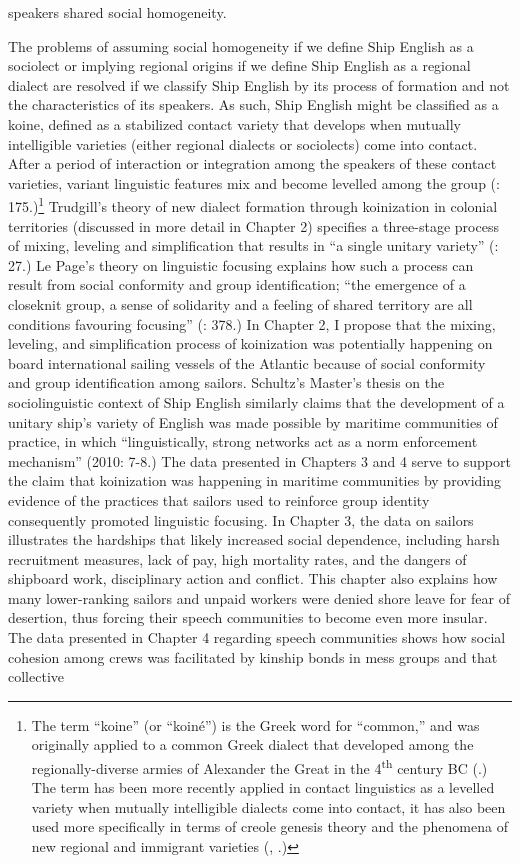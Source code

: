speakers shared social homogeneity. 

  The problems of assuming social homogeneity if we define Ship English as a sociolect or implying regional origins if we define Ship English as a regional dialect are resolved if we classify Ship English by its process of formation and not the characteristics of its speakers. As such, Ship English might be classified as a koine, defined as a stabilized contact variety that develops when mutually intelligible varieties (either regional dialects or sociolects) come into contact. After a period of interaction or integration among the speakers of these contact varieties, variant linguistic features mix and become levelled among the group (\citealt{Siegel2001}: 175.)\footnote{The term “koine” (or “koiné”) is the Greek word for “common,” and was originally applied to a common Greek dialect that developed among the regionally-diverse armies of Alexander the Great in the 4\textsuperscript{th} century BC (\citealt{Andriotis1995}.) The term has been more recently applied in contact linguistics as a levelled variety when mutually intelligible dialects come into contact, it has also been used more specifically in terms of creole genesis theory \citep{Siegel2001} and the phenomena of new regional and immigrant varieties (\citealt{Trudgill1986}, \citealt{Kerswill2004}.)} Trudgill’s theory of new dialect formation through koinization in colonial territories (discussed in more detail in Chapter 2) specifies a three-stage process of mixing, leveling and simplification that results in “a single unitary variety” (\citealt{Trudgill1986}: 27.) Le Page’s theory on linguistic focusing explains how such a process can result from social conformity and group identification; “the emergence of a closeknit group, a sense of solidarity and a feeling of shared territory are all conditions favouring focusing” (\citealt{Milroy1986}: 378.) In Chapter 2, I propose that the mixing, leveling, and simplification process of koinization was potentially happening on board international sailing vessels of the Atlantic because of social conformity and group identification among sailors. Schultz’s Master’s thesis on the sociolinguistic context of Ship English similarly claims that the development of a unitary ship’s variety of English was made possible by maritime communities of practice, in which “linguistically, strong networks act as a norm enforcement mechanism” (2010: 7-8.) The data presented in Chapters 3 and 4 serve to support the claim that koinization was happening in maritime communities by providing evidence of the practices that sailors used to reinforce group identity consequently promoted linguistic focusing. In Chapter 3, the data on sailors illustrates the hardships that likely increased social dependence, including harsh recruitment measures, lack of pay, high mortality rates, and the dangers of shipboard work, disciplinary action and conflict. This chapter also explains how many lower-ranking sailors and unpaid workers were denied shore leave for fear of desertion, thus forcing their speech communities to become even more insular. The data presented in Chapter 4 regarding speech communities shows how social cohesion among crews was facilitated by kinship bonds in mess groups and that collective 